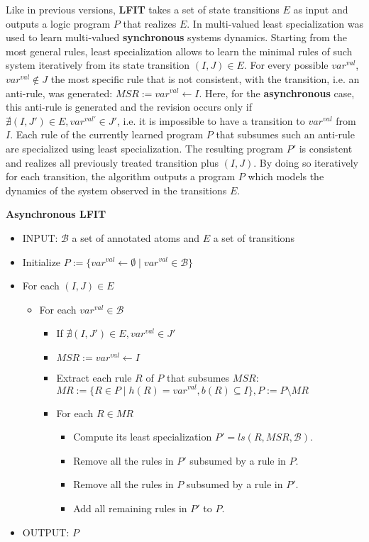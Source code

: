 Like in previous versions, {\bf LFIT} takes a set of state transitions $E$ as input and outputs a logic program $P$ that realizes $E$.
In \cite{DMTRICLP15} multi-valued least specialization was used to learn multi-valued {\bf synchronous} systems dynamics.
Starting from the most general rules, least specialization allows to learn the minimal rules of such system iteratively from its state transition $(I,J) \in E$.
For every possible $var^{val}$, $var^{val} \not \in J$ the most specific rule that is not consistent, with the transition, i.e. an anti-rule, was generated: $MSR := var^{val} \leftarrow I$.
Here, for the {\bf asynchronous} case, this anti-rule is generated and the revision occurs only if $\nexists (I,J') \in E, var^{val'} \in J'$,
i.e. it is impossible to have a transition to $var^{val}$ from $I$.
Each rule of the currently learned program $P$ that subsumes such an anti-rule are specialized using least specialization.
The resulting program $P'$ is consistent and realizes all previously treated transition plus $(I,J)$.
By doing so iteratively for each transition, the algorithm outputs a program $P$ which models the dynamics of the system observed in the transitions $E$.

\vspace{0.5em}
\noindent
\textbf{Asynchronous LFIT}
\vspace{-0.4em}
\begin{itemize}
	\item INPUT: $\mathcal{B}$ a set of annotated atoms and $E$ a set of transitions
	\item Initialize $P := \{var^{val} \leftarrow \emptyset \mid var^{val} \in \mathcal{B}\}$
	\item For each $(I,J) \in E$
	\begin{itemize}
		\item For each $var^{val} \in \mathcal{B}$
		\begin{itemize}
			\item If $\nexists (I,J') \in E, var^{val} \in J'$
			\item $MSR := var^{val} \leftarrow I$
			\item Extract each rule $R$ of $P$ that subsumes $MSR$: $MR := \{R \in P \mid h(R) = var^{val}, b(R) \subseteq I\}, P := P \setminus MR$
			\item For each $R \in MR$
			\begin{itemize}
				\item Compute its least specialization $P'=ls(R,MSR,\mathcal{B})$.
				\item Remove all the rules in $P'$ subsumed by a rule in $P$.
				\item Remove all the rules in $P$ subsumed by a rule in $P'$.
				\item Add all remaining rules in $P'$ to $P$.
			\end{itemize}
		\end{itemize}
	\end{itemize}
	\item OUTPUT: $P$
\end{itemize}

